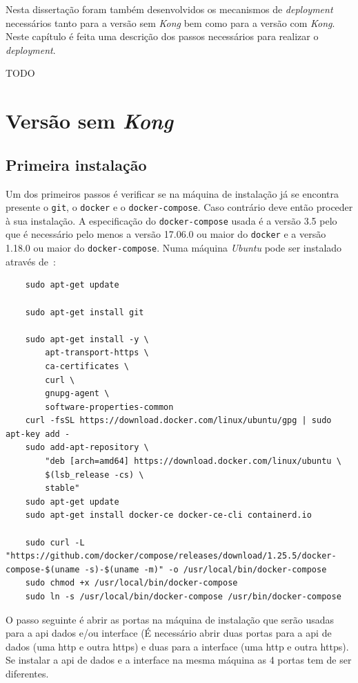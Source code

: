 Nesta dissertação foram também desenvolvidos os mecanismos de \textit{deployment} necessários tanto para a versão sem \textit{Kong} bem como para a versão com \textit{Kong}. Neste capítulo é feita uma descrição dos passos necessários para realizar o \textit{deployment}.

TODO

\section{Versão sem \textit{Kong}}\label{sec:deployNoKong}

\subsection{Primeira instalação}\label{sec:inst-prim}

Um dos primeiros passos é verificar se na máquina de instalação já se encontra presente o \texttt{git}, o \texttt{docker} e o \texttt{docker-compose}. Caso contrário deve então proceder à sua instalação. A especificação do \texttt{docker-compose} usada é a versão 3.5 pelo que é necessário pelo menos a versão 17.06.0 ou maior do \texttt{docker} e a versão 1.18.0 ou maior do \texttt{docker-compose}. Numa máquina \textit{Ubuntu} pode ser instalado através de~\cite{installDocker,installDC}:
\begin{verbatim}
    sudo apt-get update

    sudo apt-get install git

    sudo apt-get install -y \
        apt-transport-https \
        ca-certificates \
        curl \
        gnupg-agent \
        software-properties-common
    curl -fsSL https://download.docker.com/linux/ubuntu/gpg | sudo apt-key add -
    sudo add-apt-repository \
        "deb [arch=amd64] https://download.docker.com/linux/ubuntu \
        $(lsb_release -cs) \
        stable"
    sudo apt-get update
    sudo apt-get install docker-ce docker-ce-cli containerd.io

    sudo curl -L "https://github.com/docker/compose/releases/download/1.25.5/docker-compose-$(uname -s)-$(uname -m)" -o /usr/local/bin/docker-compose
    sudo chmod +x /usr/local/bin/docker-compose
    sudo ln -s /usr/local/bin/docker-compose /usr/bin/docker-compose
\end{verbatim}

O passo seguinte é abrir as portas na máquina de instalação que serão usadas para a \acrshort{api} dados e/ou interface (É necessário abrir duas portas para a \acrshort{api} de dados (uma {http} e outra \acrshort{https}) e duas para a interface (uma \acrshort{http} e outra \acrshort{https}). Se instalar a \acrshort{api} de dados e a interface na mesma máquina as 4 portas tem de ser diferentes.

